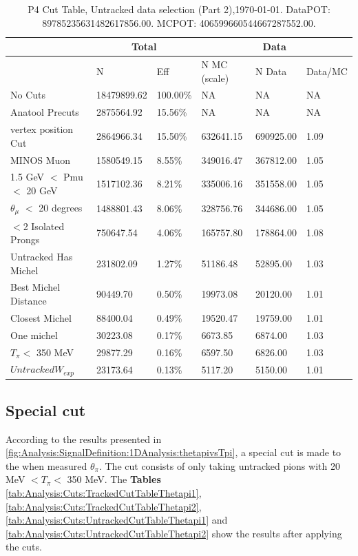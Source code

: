 \begin{table}[!hbt]
    \tiny
    \centering
    \begin{tabular}{|*{6}{l|}}


    \hline
    & \multicolumn{2}{c|}{Total} & \multicolumn{3}{c|}{Data} \\
    \hline
&  N         & Eff     & N MC (scale) & N Data    & Data/MC \\\hline
 No Cuts  & 18479899.62 & 100.00\% & NA & NA & NA \\ \hline
 Anatool Precuts  & 2875564.92 &  15.56\% & NA & NA & NA \\ \hline
 vertex position Cut & 2864966.34     &  15.50\% & 632641.15     & 690925.00 &   1.09 \\ \hline
 MINOS Muon    & 1580549.15     &   8.55\% & 349016.47     & 367812.00 &   1.05 \\ \hline
 1.5 GeV $<$ Pmu $<$ 20 GeV    & 1517102.36     &   8.21\% & 335006.16     & 351558.00 &   1.05 \\ \hline
 $\theta_{\mu}$ $<$ 20 degrees   & 1488801.43     &   8.06\% & 328756.76     & 344686.00 &   1.05 \\ \hline
 $<$2 Isolated Prongs    & 750647.54     &   4.06\% & 165757.80     & 178864.00 &   1.08 \\ \hline
 Untracked Has Michel   & 231802.09     &   1.27\% & 51186.48     & 52895.00 &   1.03 \\ \hline
 Best Michel Distance   & 90449.70     &   0.50\% & 19973.08     & 20120.00 &   1.01 \\ \hline
 Closest Michel   & 88400.04     &   0.49\% & 19520.47     & 19759.00 &   1.01 \\ \hline
 One michel   & 30223.08     &   0.17\% & 6673.85     & 6874.00 &   1.03 \\ \hline
 $T_\pi<$ 350 MeV   & 29877.29     &   0.16\% & 6597.50     & 6826.00 &   1.03 \\ \hline
 $Untracked W_{exp}$  & 23173.64     &   0.13\% & 5117.20     & 5150.00 &   1.01 \\ \hline
    \end{tabular}
    \caption{P4 Cut Table, Untracked data selection (Part 2),\today. DataPOT: 89785235631482617856.00. MCPOT: 406599660544667287552.00.}
    \label{tab:Analysis:Cuts:UntrackedCutTable2}
\end{table}

\pagebreak

\subsection{Special cut}
\label{Cap:Analysis:DataSelection:Cuts:SpecialCut}
According to the results presented in \ref{fig:Analysis:SignalDefinition:1DAnalysis:thetapivsTpi}, a special cut is made to the when measured $\theta_\pi$. The cut consists of only taking untracked pions with 20 MeV $< T_\pi < $ 350 MeV. The \textbf{Tables} \ref{tab:Analysis:Cuts:TrackedCutTableThetapi1}, \ref{tab:Analysis:Cuts:TrackedCutTableThetapi2}, \ref{tab:Analysis:Cuts:UntrackedCutTableThetapi1} and \ref{tab:Analysis:Cuts:UntrackedCutTableThetapi2} show the results after applying the cuts.

